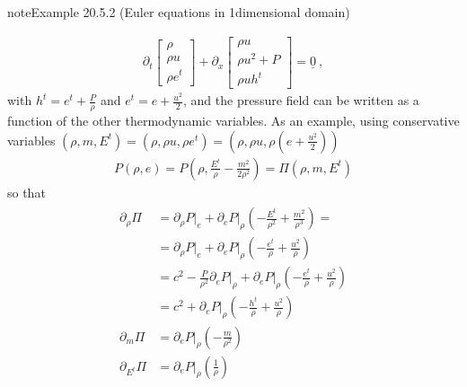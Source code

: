 \documentclass[letterpaper,10pt,english]{jupyterBook}
\begin{document}
\begin{sphinxadmonition}{note}{Example 20.5.2 (Euler equations in 1\sphinxhyphen{}dimensional domain)}



\sphinxAtStartPar
{}
\begin{equation*}
\begin{split}\partial_t \begin{bmatrix} \rho \\ \rho u \\ \rho e^t \end{bmatrix} + \partial_x \begin{bmatrix} \rho u \\ \rho u^2 + P \\ \rho u h^t  \end{bmatrix} = \underline{0} \ ,\end{split}
\end{equation*}
\sphinxAtStartPar
with \(h^t = e^t + \frac{P}{\rho}\) and \(e^t = e + \frac{u^2}{2}\), and the pressure field can be written as a function of the other thermodynamic variables. As an example, using conservative variables \((\rho, m, E^t) = (\rho, \rho u, \rho e^t) = \left(\rho, \rho u, \rho \left(e + \frac{u^2}{2}\right) \right)\)
\begin{equation*}
\begin{split}P(\rho, e) = P\left(\rho, \frac{E^t}{\rho} - \frac{m^2}{2 \rho^2}\right) = \Pi\left( \rho, m, E^t \right)\end{split}
\end{equation*}
\sphinxAtStartPar
so that
\begin{equation*}
\begin{split}\begin{aligned}
 \partial_{\rho} \Pi
  & = \partial_\rho P \big|_e + \partial_e P \big|_\rho \left( -\frac{E^t}{\rho^2} + \frac{m^2}{\rho^3} \right) = \\
  & = \partial_\rho P \big|_e + \partial_e P \big|_\rho \left( - \frac{e^t}{\rho} + \frac{u^2}{\rho} \right) \\
  & = c^2 - \frac{P}{\rho^2} \partial_e P \big|_\rho + \partial_e P \big|_\rho \left( - \frac{e^t}{\rho} + \frac{u^2}{\rho} \right) \\
  & = c^2 + \partial_e P \big|_\rho \left( - \frac{h^t}{\rho} + \frac{u^2}{\rho} \right) \\
 \partial_{m   } \Pi & = \partial_e P \big|_\rho \left( - \frac{m}{\rho^2}  \right) \\
 \partial_{E^t } \Pi & = \partial_e P \big|_\rho \left( \frac{1}{\rho} \right) \\
\end{aligned}\end{split}
\end{equation*}



\end{sphinxadmonition}
\end{document}
